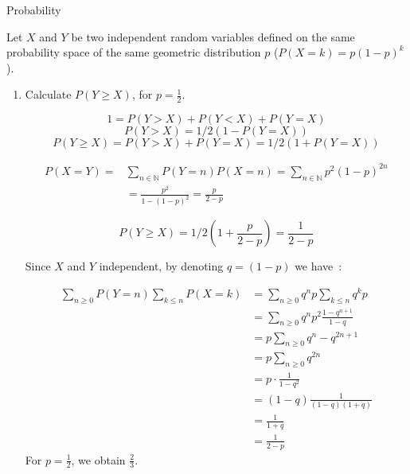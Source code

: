 \documentclass[a4paper,11pt]{exam}
\newcommand{\N}{\mathbb{N}}
\begin{document}
\begin{questions}
	

\begin{EnvFullwidth}
	\colorbox{gris}{
		\begin{minipage}[c]{\textwidth}
			Probability
		\end{minipage}
	}
\end{EnvFullwidth}



Let $ X $ and $ Y $ be two independent random variables defined on the same probability space of the same geometric distribution $p$  ($P(X = k) = p(1-p)^k$).
\begin{enumerate}
	
	\item Calculate $P(Y \geq X)$, for $p=\frac{1}{2}$.
	
	\begin{solution}
		\[
		1= P(Y > X)+P(Y < X)+P(Y = X)
		\]
		\[
		P(Y > X) = 1/2(1 -P(Y = X))
		\]		
		\[
		P(Y \geq X) = P(Y > X) + P(Y = X) =  1/2(1 +P(Y = X))
		\]
		
		
		
		\begin{align*}
		P(X=Y)=& \sum_{n\in\N }P(Y = n) P(X = n)
		= \sum_{n\in\N} p^2(1-p)^{2n}\\& =\frac{p^2}{1-(1-p)^2} = \frac{p}{2-p}
		\end{align*}
		
		\[
		P(Y \geq X) =  1/2(1 +\frac{p}{2-p}) = \frac{1}{2-p} 
		\]
		
		
		
		Since $X$ and $Y$ independent, by denoting $q=(1-p)$ we have~:
		
		\begin{align*}
		\sum_{n \geq 0} P(Y=n) \sum_{k \leq n} P(X=k)
		&= \sum_{n \geq 0} q^n p \sum_{k \leq n} q^k p \\
		&= \sum_{n \geq 0} q^n p^2 \frac{1-q^{n+1}}{1-q} \\
		&= p \sum_{n \geq 0} q^n -q^{2n+1} \\
		&= p \sum_{n \geq 0} q^{2n} \\
		&= p \cdot \frac{1}{1-q^2} \\
		&= (1-q) \frac{1}{(1-q)(1+q)} \\
		&= \frac{1}{1+q} \\
		&= \frac{1}{2-p}
		\end{align*}
		For $p=\frac{1}{2}$, we obtain $\frac{2}{3}$.
	\end{solution}
		

\end{enumerate}
\end{questions}
\end{document}
